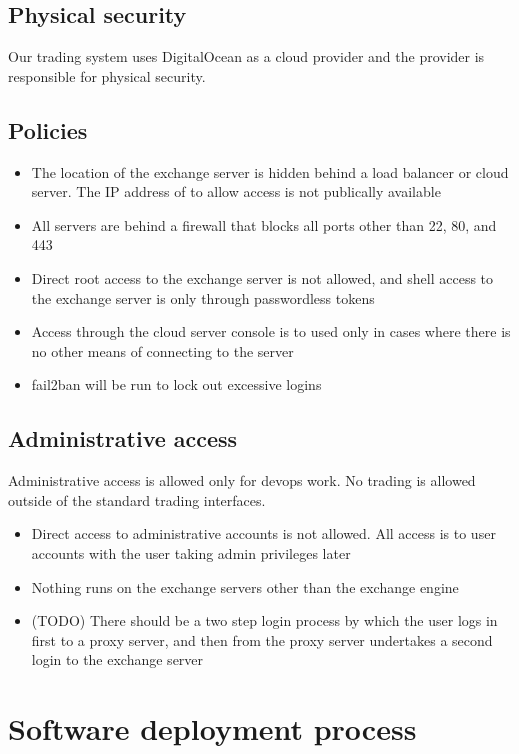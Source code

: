 \subsection{Physical security}
Our trading system uses DigitalOcean as a cloud provider and the
provider is responsible for physical security.


\subsection{Policies}
\begin{itemize}
  \item The location of the exchange server is hidden behind a load
  balancer or cloud server.  The IP address of to allow access is not
  publically available
  \item All servers are behind a firewall that blocks all ports other
    than 22, 80, and 443
  \item Direct root access to the exchange server is not allowed, and
    shell access to the exchange server is only through passwordless
    tokens
  \item Access through the cloud server console is to used only in
    cases where there is no other means of connecting to the server
  \item fail2ban will be run to lock out excessive logins 
\end{itemize}

\subsection{Administrative access}
Administrative access is allowed only for devops work.  No trading is
allowed outside of the standard trading interfaces.

\begin{itemize}
\item Direct access to administrative accounts is not allowed.  All
  access is to user accounts with the user taking admin privileges
  later
\item Nothing runs on the exchange servers other than the exchange engine
\item (TODO) There should be a two step login process by which the
  user logs in first to a proxy server, and then from the proxy server
  undertakes a second login to the exchange server
\end{itemize}

\section{Software deployment process}
